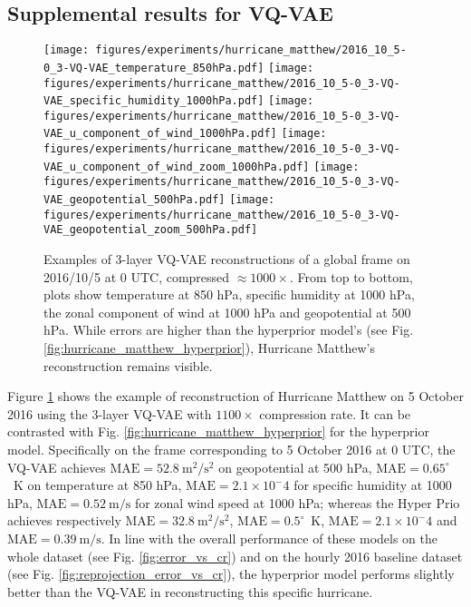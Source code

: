 \subsection{Supplemental results for VQ-VAE}

\begin{figure}
    \centering
    \texttt{[image: figures/experiments/hurricane\_matthew/2016\_10\_5-0\_3-VQ-VAE\_temperature\_850hPa.pdf]}
    \texttt{[image: figures/experiments/hurricane\_matthew/2016\_10\_5-0\_3-VQ-VAE\_specific\_humidity\_1000hPa.pdf]}
    \texttt{[image: figures/experiments/hurricane\_matthew/2016\_10\_5-0\_3-VQ-VAE\_u\_component\_of\_wind\_1000hPa.pdf]}
    \texttt{[image: figures/experiments/hurricane\_matthew/2016\_10\_5-0\_3-VQ-VAE\_u\_component\_of\_wind\_zoom\_1000hPa.pdf]}
    \texttt{[image: figures/experiments/hurricane\_matthew/2016\_10\_5-0\_3-VQ-VAE\_geopotential\_500hPa.pdf]}
    \texttt{[image: figures/experiments/hurricane\_matthew/2016\_10\_5-0\_3-VQ-VAE\_geopotential\_zoom\_500hPa.pdf]}
    \hfill
    \caption{Examples of 3-layer VQ-VAE reconstructions of a global frame on 2016/10/5 at 0 UTC, compressed $\approx 1000\times$. From top to bottom, plots show temperature at 850 hPa, specific humidity at 1000 hPa, the zonal component of wind at 1000 hPa and geopotential at 500 hPa. While errors are higher than the hyperprior model's (see Fig. \ref{fig:hurricane_matthew_hyperprior}), Hurricane Matthew's reconstruction remains visible.}
    \label{fig:hurricane_matthew_vqvae}
\end{figure}

Figure \ref{fig:hurricane_matthew_vqvae} shows the example of reconstruction of Hurricane Matthew on 5 October 2016 using the 3-layer VQ-VAE with $1100\times$ compression rate. It can be contrasted with Fig. \ref{fig:hurricane_matthew_hyperprior} for the hyperprior model. Specifically on the frame corresponding to 5 October 2016 at 0 UTC, the VQ-VAE achieves $\text{MAE}=52.8~\text{m}^2/\text{s}^2$ on geopotential at 500 hPa, $\text{MAE}=0.65^\circ$~K on temperature at 850 hPa, $\text{MAE}=2.1 \times 10^-4$ for specific humidity at 1000 hPa, $\text{MAE}=0.52~\text{m}/\text{s}$ for zonal wind speed at 1000 hPa; whereas the Hyper Prio achieves respectively $\text{MAE}=32.8~\text{m}^2/\text{s}^2$, $\text{MAE}=0.5^\circ$~K, $\text{MAE}=2.1\times10^-4$ and $\text{MAE}=0.39~\text{m}/\text{s}$. In line with the overall performance of these models on the whole dataset (see Fig. \ref{fig:error_vs_cr}) and on the hourly 2016 baseline dataset (see Fig. \ref{fig:reprojection_error_vs_cr}), the hyperprior model performs slightly better than the VQ-VAE in reconstructing this specific hurricane.

